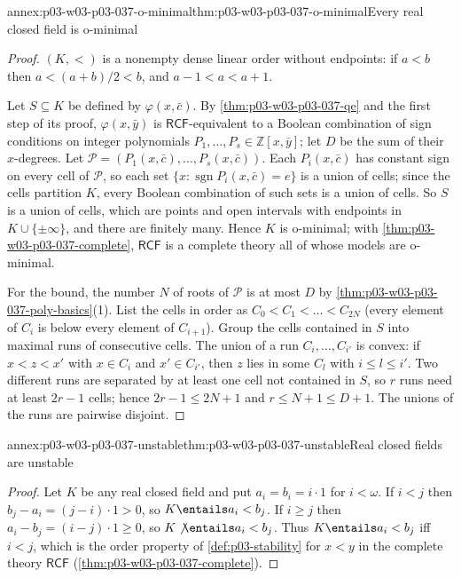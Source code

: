 \begin{annexitem}{annex:p03-w03-p03-037-o-minimal}{thm:p03-w03-p03-037-o-minimal}{Every real closed field is o-minimal}
\begin{proof}
\((K,<)\) is a nonempty dense linear order without endpoints: if \(a<b\) then
\(a<(a+b)/2<b\), and \(a-1<a<a+1\).

Let \(S\subseteq K\) be defined by \(\varphi(x,\bar c)\).  By
\cref{thm:p03-w03-p03-037-qe} and the first step of its proof,
\(\varphi(x,\bar y)\) is \(\mathsf{RCF}\)-equivalent to a Boolean
combination of sign conditions on integer polynomials
\(P_1,\dots,P_s\in\mathbb Z[x,\bar y]\); let \(D\) be the sum of their
\(x\)-degrees.  Let \(\mathcal P=(P_1(x,\bar c),\dots,P_s(x,\bar c))\).  Each
\(P_i(x,\bar c)\) has constant sign on every cell of \(\mathcal P\), so each
set \(\{x:\operatorname{sgn}P_i(x,\bar c)=e\}\) is a union of cells; since the
cells partition \(K\), every Boolean combination of such sets is a union of
cells.  So \(S\) is a union of cells, which are points and open intervals with
endpoints in \(K\cup\{\pm\infty\}\), and there are finitely many.  Hence
\(K\) is o-minimal; with \cref{thm:p03-w03-p03-037-complete},
\(\mathsf{RCF}\) is a complete theory all of whose models are o-minimal.

For the bound, the number \(N\) of roots of \(\mathcal P\) is at most \(D\)
by \cref{thm:p03-w03-p03-037-poly-basics}(1).  List the cells in order as
\(C_0<C_1<\dots<C_{2N}\) (every element of \(C_i\) is below every element of
\(C_{i+1}\)).  Group the cells contained in \(S\) into maximal runs of
consecutive cells.  The union of a run \(C_i,\dots,C_{i'}\) is convex: if
\(x<z<x'\) with \(x\in C_i\) and \(x'\in C_{i'}\), then \(z\) lies in some
\(C_l\) with \(i\leq l\leq i'\).  Two different runs are separated by at least
one cell not contained in \(S\), so \(r\) runs need at least \(2r-1\) cells;
hence \(2r-1\leq2N+1\) and \(r\leq N+1\leq D+1\).  The unions of the runs are
pairwise disjoint.
\end{proof}
\end{annexitem}

\begin{annexitem}{annex:p03-w03-p03-037-unstable}{thm:p03-w03-p03-037-unstable}{Real closed fields are unstable}
\begin{proof}
Let \(K\) be any real closed field and put \(a_i=b_i=i\cdot1\) for
\(i<\omega\).  If \(i<j\) then \(b_j-a_i=(j-i)\cdot1>0\), so
\(K\entails a_i<b_j\).  If \(i\geq j\) then \(a_i-b_j=(i-j)\cdot1\geq0\), so
\(K\not\entails a_i<b_j\).  Thus \(K\entails a_i<b_j\) iff \(i<j\), which is
the order property of \cref{def:p03-stability} for \(x<y\) in the complete
theory \(\mathsf{RCF}\) (\cref{thm:p03-w03-p03-037-complete}).
\end{proof}
\end{annexitem}


